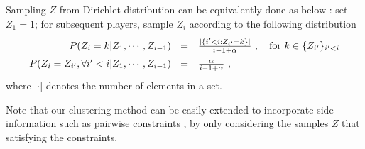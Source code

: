 Sampling $Z$ from Dirichlet distribution can be equivalently done as below \cite{neal2000markov}: 
set $Z_1 = 1$; for subsequent players, sample $Z_i$ according to  the following distribution 
\begin{equation*}
\label{eq:condition}
\renewcommand*{\arraystretch}{1.5}
\begin{array}{rl}
    P(Z_i = k | Z_1, \cdots, Z_{i-1}) 
~~=& \frac{|\{i' < i : Z_{i'} = k\}|}{i-1 + \alpha}  ~, \quad \text{for } k \in \{Z_{i'}\}_{i' < i}  \\
   P(Z_i = Z_{i'}, \forall i' < i | Z_1, \cdots, Z_{i-1}) 
~~=& \frac{\alpha}{i-1 + \alpha} ~,
\end{array}
\end{equation*}
where $|\cdot|$ denotes the number of elements in a set.

Note that our clustering method can be easily extended to incorporate side information 
such as pairwise constraints \cite{constraintBook}, by only considering the samples $Z$ that
satisfying the constraints.

